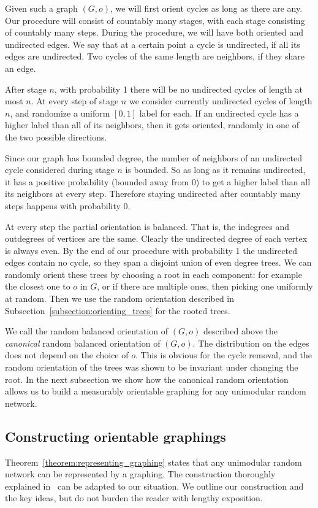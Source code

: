 \documentclass[11pt]{article}
\theoremstyle{definition}
\numberwithin{equation}{section}
\numberwithin{figure}{section}
\numberwithin{table}{section}
\begin{document}
Given such a graph $(G,o)$, we will first orient cycles as long as there are any. Our procedure will consist of countably many stages, with each stage consisting of countably many steps. During the procedure, we will have both oriented and undirected edges. We say that at a certain point a cycle is undirected, if all its edges are undirected. Two cycles of the same length are neighbors, if they share an edge.

After stage $n$, with probability 1 there will be no undirected cycles of length at most $n$. At every step of stage $n$ we consider currently undirected cycles of length $n$, and randomize a uniform $[0,1]$ label for each. If an undirected cycle has a higher label than all of its neighbors, then it gets oriented, randomly in one of the two possible directions.

Since our graph has bounded degree, the number of neighbors of an undirected cycle considered during stage $n$ is bounded. So as long as it remains undirected, it has a positive probability (bounded away from 0) to get a higher label than all its neighbors at every step. Therefore staying undirected after countably many steps happens with probability 0.

At every step the partial orientation is balanced. That is, the indegrees and outdegrees of vertices are the same. Clearly the undirected degree of each vertex is always even. By the end of our procedure with probability 1 the undirected edges contain no cycle, so they span a disjoint union of even degree trees. We can randomly orient these trees by choosing a root in each component: for example the closest one to $o$ in $G$, or if there are multiple ones, then picking one uniformly at random. Then we use the random orientation described in Subsection~\ref{subsection:orienting_trees} for the rooted trees.

We call the random balanced orientation of $(G,o)$ described above the \emph{canonical} random balanced orientation of $(G,o)$. The distribution on the edges does not depend on the choice of $o$. This is obvious for the cycle removal, and the random orientation of the trees was shown to be invariant under changing the root. In the next subsection we show how the canonical random orientation allows us to build a measurably orientable graphing for any unimodular random network.


\subsection{Constructing orientable graphings} \label{subsection:constructing_graphings}
Theorem~\ref{theorem:representing_graphing} states that any unimodular random network can be represented by a graphing. The construction thoroughly explained in~\cite[Theorem~18.37]{lovasz2012large} can be adapted to our situation. We outline our construction and the key ideas, but do not burden the reader with lengthy exposition.
\end{document}
